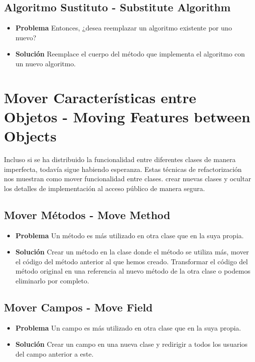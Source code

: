 \documentclass[11pt,a4paper,oneside]{book}
\begin{document}
\subsection{Algoritmo Sustituto - Substitute Algorithm}
\label{substitutealgorithm}
\begin{itemize}
    \item \textbf{Problema} Entonces, ¿desea reemplazar un algoritmo existente por uno nuevo?
    \item \textbf{Solución} Reemplace el cuerpo del método que implementa el algoritmo con un nuevo algoritmo.
\end{itemize}




\section{Mover Características entre Objetos - Moving Features between Objects}

\label{renombrarmetodo} Incluso si se ha distribuido la funcionalidad entre diferentes clases de manera imperfecta, todavía sigue habiendo esperanza.
Estas técnicas de refactorización nos muestran como mover funcionalidad entre clases. crear nuevas clases y ocultar los detalles de implementación al acceso público de manera segura.


\subsection{Mover Métodos - Move Method}  
\begin{itemize}
    \item \textbf{Problema} Un método es más utilizado en otra clase que en la suya propia.
    \item \textbf{Solución} Crear un método en la clase donde el método se utiliza más, mover el código del método anterior al que hemos creado. Transformar el código del método original en una referencia al nuevo método de la otra clase o podemos eliminarlo por completo.
\end{itemize}
    
\subsection{Mover Campos - Move Field}
\begin{itemize}
    \item \textbf{Problema} Un campo es más utilizado en otra clase que en la suya propia.
    \item \textbf{Solución} Crear un campo en una nueva clase y redirigir a todos los usuarios del campo anterior a este.
\end{itemize}
    
\end{document}
